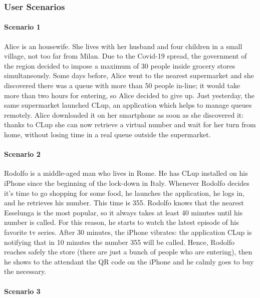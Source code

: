 \documentclass[table, 12pt]{article}
\begin{document}
\subsubsection{User Scenarios}
\paragraph{Scenario 1}

Alice is an housewife. She lives with her husband and four children in a small village, not too far from Milan. Due to the Covid-19 spread, the government of the region decided to impose a maximum of 30 people inside grocery stores simultaneously. Some days before, Alice went to the nearest supermarket and she discovered there was a queue with more than 50 people in-line; it would take more than two hours for entering, so Alice decided to give up. Just yesterday, the same supermarket launched CLup, an application which helps to manage queues remotely. Alice downloaded it on her smartphone as soon as she discovered it: thanks to CLup she can now retrieve a virtual number and wait for her turn from home, without losing time in a real queue outside the supermarket.\\


\paragraph{Scenario 2}

Rodolfo is a middle-aged man who lives in Rome. He has CLup installed on his iPhone since the beginning of the lock-down in Italy. Whenever Rodolfo decides it's time to go shopping for some food, he launches the application, he logs in, and he retrieves his number. This time is 355. Rodolfo knows that the nearest Esselunga is the most popular, so it always takes at least 40 minutes until his number is called. For this reason, he starts to watch the latest episode of his favorite tv series. After 30 minutes, the iPhone vibrates: the application CLup is notifying that in 10 minutes the number 355 will be called. Hence, Rodolfo reaches safely the store (there are just a bunch of people who are entering), then he shows to the attendant the QR code on the iPhone and he calmly goes to buy the necessary. \\



\paragraph{Scenario 3}
\end{document}
